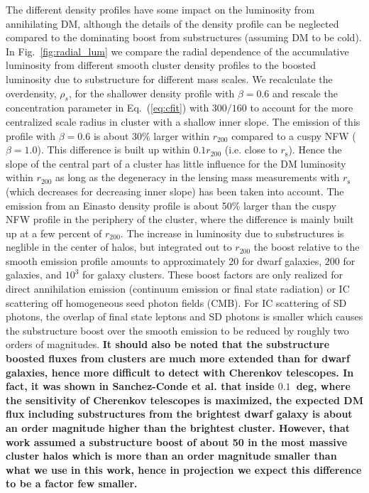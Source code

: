 \documentclass[10pt,aps,pra,reprint,amsmath,amsfonts,amssymb,showpacs,nofootinbib,floatfix]{revtex4-1}
\def\C#1{{\bf #1}}
\newcommand{\rmn}{\mathrm}
\newcommand{\s}{\rmn{s}}
\newcommand{\rhos}{\ensuremath{\rho_s}}
\newcommand{\rvir}{r_{200}}
\begin{document}
The different density profiles have some impact on the luminosity from
annihilating DM, although the details of the density profile can be
neglected compared to the dominating boost from substructures
(assuming DM to be cold). In Fig.~\ref{fig:radial_lum} we compare the
radial dependence of the accumulative luminosity from different smooth
cluster density profiles to the boosted luminosity due to substructure
for different mass scales. We recalculate the overdensity, $\rhos$,
for the shallower density profile with $\beta=0.6$ and rescale the
concentration parameter in Eq.~(\ref{eq:cfit}) with $300/160$
\cite{2011ApJ...728L..39N} to account for the more centralized scale
radius in cluster with a shallow inner slope. The emission of this
profile with $\beta=0.6$ is about 30\% larger within $\rvir$ compared
to a cuspy NFW ($\beta=1.0$).  This difference is built up within
$0.1\rvir$ (i.e. close to $r_\s$). Hence the slope of the central part
of a cluster has little influence for the DM luminosity within $\rvir$
as long as the degeneracy in the lensing mass measurements with $r_\s$
(which decreases for decreasing inner slope) has been taken into
account. The emission from an Einasto density profile is about 50\%
larger than the cuspy NFW profile in the periphery of the cluster,
where the difference is mainly built up at a few percent of
$\rvir$. The increase in luminosity due to substructures is neglible
in the center of halos, but integrated out to $\rvir$ the boost
relative to the smooth emission profile amounts to approximately 20
for dwarf galaxies, $200$ for galaxies, and $10^3$ for galaxy
clusters. These boost factors are only realized for direct
annihilation emission (continuum emission or final state radiation) or
IC scattering off homogeneous seed photon fields (CMB). For IC
scattering of SD photons, the overlap of final state leptons and SD
photons is smaller which causes the substructure boost over the smooth
emission to be reduced by roughly two orders of magnitudes. \C{It
  should also be noted that the substructure boosted fluxes from
  clusters are much more extended than for dwarf galaxies, hence more
  difficult to detect with Cherenkov telescopes. In fact, it was shown
  in Sanchez-Conde et al. \cite{2011arXiv1104.3530S} that inside
  $0.1$~deg, where the sensitivity of Cherenkov telescopes is
  maximized, the expected DM flux including substructures from the
  brightest dwarf galaxy is about an order magnitude higher than the
  brightest cluster. However, that work assumed a substructure boost
  of about 50 in the most massive cluster halos which is more than an
  order magnitude smaller than what we use in this work, hence in
  projection we expect this difference to be a factor few smaller.}
\end{document}
